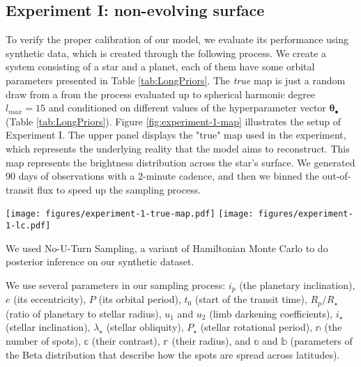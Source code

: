 \documentclass[twocolumn]{aastex631}
\begin{document}
\subsection{Experiment I: non-evolving surface}
\label{sec:experiment1}
To verify the proper calibration of our model, we evaluate its performance using synthetic data, which is created through the following process.
We create a system consisting of a star and a planet, each of them have some orbital parameters presented in Table \ref{tab:LongPriors}. 
The \textit{true} map is just a random draw from a from the process evaluated up to spherical harmonic degree
$l_{max} = 15$ and conditioned on different values of the hyperparameter vector $\pmb{\theta}_\bullet$ (Table \ref{tab:LongPriors}). Figure \ref{fig:experiment-1-map} 
illustrates the setup of Experiment I. The upper panel displays the "true" map used in the experiment, which represents the underlying reality that 
the model aims to reconstruct. This map represents the brightness distribution across the star's surface. We generated 90 days of observations with a 2-minute
cadence, and then we binned the out-of-transit flux to speed up the sampling process.
\begin{figure*}[ht!]
    \begin{centering}
        \texttt{[image: figures/experiment-1-true-map.pdf]}
        \texttt{[image: figures/experiment-1-lc.pdf]}
        \caption{
            The upper panel shows the \textit{true} map for the Experiment I of this paper. The black dots on the map indicate the trajectory of the 
            planet as it moves across the face of the star during the transit event. The left panel 
            shows the stellar map along with its orientation on the sky and the right panel shows the rectangular projection of the map. 
            The bottom panel is the generated light curve. The black line is the \textit{true} light curve and the blue dots show the binned light curve
            that's used in the model.
        }
        \label{fig:experiment-1-map}
    \end{centering}
\end{figure*}

We used No-U-Turn Sampling, a variant of Hamiltonian Monte Carlo \citep[NUTS;][]{Duane1987,Hoffman2011} to do posterior inference on our synthetic dataset.

We use several parameters in our sampling process: $i_p$ (the planetary inclination), $e$ (its eccentricity), $P$ (its orbital period),
$t_0$ (start of the transit time), $R_p/R_\star$ (ratio of planetary to stellar radius), $u_1$ and $u_2$ (limb darkening coefficients),
$i_\star$ (stellar inclination), $\lambda_\star$ (stellar obliquity), $P_\star$ (stellar rotational period), $\mathbb{n}$ (the number of spots), 
$\mathbb{c}$ (their contrast), $\mathbb{r}$ (their radius), and $\mathbb{a}$ and $\mathbb{b}$ (parameters of the Beta distribution that describe 
how the spots are spread across latitudes).  
\end{document}
